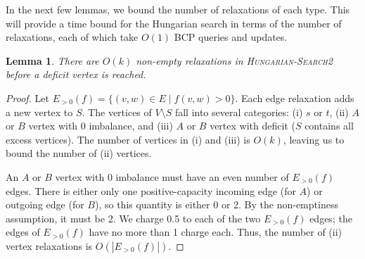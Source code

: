 \documentclass[11pt]{article}
\def\eps{\varepsilon}
\theoremstyle{plain}
\newtheorem{lemma}{Lemma}
\begin{document}







In the next few lemmas, we bound the number of relaxations of each type.
This will provide a time bound for the Hungarian search in terms of the
number of relaxations, each of which take $O(1)$ BCP queries and updates.

\begin{lemma}
\label{lemma:goldberg_hs_length1}
	There are $O(k)$ non-empty relaxations in \textsc{Hungarian-Search2}
	before a deficit vertex is reached.
\end{lemma}
\begin{proof}
	Let $E_{>0}(f) = \{(v, w) \in E \mid f(v, w) > 0\}$.
	Each edge relaxation adds a new vertex to $S$.
	The vertices of $V \setminus S$ fall into several categories:
	(i) $s$ or $t$, (ii) $A$ or $B$ vertex with 0 imbalance, and (iii) $A$
	or $B$ vertex with deficit ($S$ contains all excess vertices).
	The number of vertices in (i) and (iii) is $O(k)$, leaving us to bound
	the number of (ii) vertices.

	An $A$ or $B$ vertex with 0 imbalance must have an even number of
	$E_{>0}(f)$ edges.
	There is either only one positive-capacity incoming edge (for $A$) or
	outgoing edge (for $B$), so this quantity is either 0 or 2.
	By the non-emptiness assumption, it must be 2.
	We charge 0.5 to each of the two $E_{>0}(f)$ edges;
	the edges of $E_{>0}(f)$ have no more than 1 charge each.
	Thus, the number of (ii) vertex relaxations is $O(|E_{>0}(f)|)$.
\end{proof}
\end{document}
